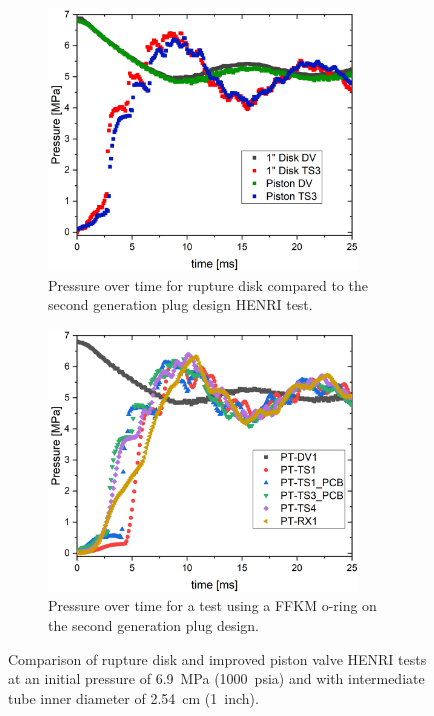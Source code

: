 \begin{figure}[htbp]
    \vspace{16pt}
    \centering
    \begin{subfigure}[t]{0.45\textwidth}
        \centering
        \includegraphics[width=0.9\textwidth]{results/plots/BD_Piston_1000_overlay.png}
        \caption{Pressure over time for rupture disk compared to the second generation plug design HENRI test.}
        \label{fig:disk new}
    \end{subfigure}
    \hfill
    \begin{subfigure}[t]{0.45\textwidth}
        \centering
        \includegraphics[width=0.9\textwidth]{results/plots/1000psi_Mpa_25.png}
        \caption{Pressure over time for a test using a FFKM o-ring on the second generation plug design.}
        \label{fig:piston 1000psi 25ms}
    \end{subfigure}
    
    \caption{Comparison of rupture disk and improved piston valve HENRI tests at an initial pressure of \SI{6.9}{\mega\pascal} (\SI{1000}{psia}) and with intermediate tube inner diameter of \SI{2.54}{\centi\meter} (\SI{1}{inch}).}
    \label{fig:new piston v disk}
    \vspace{16pt}
\end{figure}


